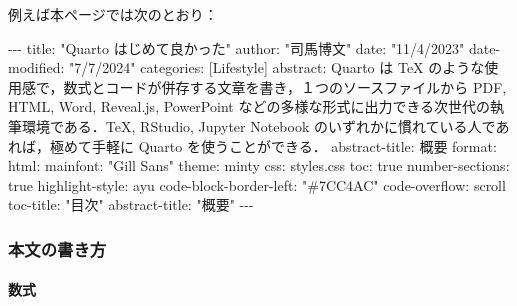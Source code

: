 \documentclass[
]{ltjsarticle}
\newenvironment{Shaded}{\begin{snugshade}}{\end{snugshade}}
\newcommand{\AttributeTok}[1]{\textcolor[rgb]{0.40,0.45,0.13}{#1}}
\newcommand{\CharTok}[1]{\textcolor[rgb]{0.13,0.47,0.30}{#1}}
\newcommand{\FunctionTok}[1]{\textcolor[rgb]{0.28,0.35,0.67}{#1}}
\newcommand{\KeywordTok}[1]{\textcolor[rgb]{0.00,0.23,0.31}{#1}}
\newcommand{\PreprocessorTok}[1]{\textcolor[rgb]{0.68,0.00,0.00}{#1}}
\newcommand{\StringTok}[1]{\textcolor[rgb]{0.13,0.47,0.30}{#1}}
\begin{document}
例えば本ページでは次のとおり：

\begin{Shaded}
\begin{Highlighting}[]
\PreprocessorTok{{-}{-}{-}}
\FunctionTok{title}\KeywordTok{:}\AttributeTok{ }\StringTok{"Quarto はじめて良かった"}
\FunctionTok{author}\KeywordTok{:}\AttributeTok{ }\StringTok{"司馬博文"}
\FunctionTok{date}\KeywordTok{:}\AttributeTok{ }\StringTok{"11/4/2023"}
\FunctionTok{date{-}modified}\KeywordTok{:}\AttributeTok{ }\StringTok{"7/7/2024"}
\FunctionTok{categories}\KeywordTok{:}\AttributeTok{ }\KeywordTok{[}\AttributeTok{Lifestyle}\KeywordTok{]}
\FunctionTok{abstract}\KeywordTok{:}\AttributeTok{ Quarto は TeX のような使用感で，数式とコードが併存する文章を書き，１つのソースファイルから PDF, HTML, Word, Reveal.js, PowerPoint などの多様な形式に出力できる次世代の執筆環境である．TeX, RStudio, Jupyter Notebook のいずれかに慣れている人であれば，極めて手軽に Quarto を使うことができる．}
\FunctionTok{abstract{-}title}\KeywordTok{:}\AttributeTok{ 概要}
\FunctionTok{format}\KeywordTok{:}
\AttributeTok{  }\FunctionTok{html}\KeywordTok{:}
\AttributeTok{    }\FunctionTok{mainfont}\KeywordTok{:}\AttributeTok{ }\StringTok{"Gill Sans"}
\AttributeTok{    }\FunctionTok{theme}\KeywordTok{:}\AttributeTok{ minty}
\AttributeTok{    }\FunctionTok{css}\KeywordTok{:}\AttributeTok{ styles.css}
\AttributeTok{    }\FunctionTok{toc}\KeywordTok{:}\AttributeTok{ }\CharTok{true}
\AttributeTok{    }\FunctionTok{number{-}sections}\KeywordTok{:}\AttributeTok{ }\CharTok{true}
\AttributeTok{    }\FunctionTok{highlight{-}style}\KeywordTok{:}\AttributeTok{ ayu}
\AttributeTok{    }\FunctionTok{code{-}block{-}border{-}left}\KeywordTok{:}\AttributeTok{ }\StringTok{"\#7CC4AC"}
\AttributeTok{    }\FunctionTok{code{-}overflow}\KeywordTok{:}\AttributeTok{ scroll}
\AttributeTok{    }\FunctionTok{toc{-}title}\KeywordTok{:}\AttributeTok{ }\StringTok{"目次"}
\AttributeTok{    }\FunctionTok{abstract{-}title}\KeywordTok{:}\AttributeTok{ }\StringTok{"概要"}
\PreprocessorTok{{-}{-}{-}}
\end{Highlighting}
\end{Shaded}

\subsubsection{本文の書き方}\label{ux672cux6587ux306eux66f8ux304dux65b9}

\paragraph{数式}\label{ux6570ux5f0f}
\end{document}
